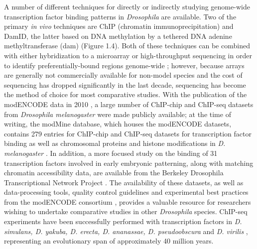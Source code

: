 A number of different techniques for directly or indirectly studying genome-wide transcription factor binding patterns in \emph{Drosophila} are available. Two of the primary \emph{in vivo} techniques are ChIP (chromatin immunoprecipitation) and DamID, the latter based on DNA methylation by a tethered DNA adenine methyltransferase (dam) \citep{greil_[16]_2006} (Figure 1.4). Both of these techniques can be combined with either hybridization to a microarray or high-throughput sequencing in order to identify preferentially-bound regions genome-wide \citep{aleksic_chiping_2009,van_steensel_chromatin_2001}; however, because arrays are generally not commercially available for non-model species and the cost of sequencing has dropped significantly in the last decade, sequencing has become the method of choice for most comparative studies. With the publication of the modENCODE data in 2010 \citep{the_modencode_consortium_identification_2010}, a large number of ChIP-chip and ChIP-seq datasets from \emph{Drosophila melanogaster} were made publicly available; at the time of writing, the modMine database, which houses the modENCODE datasets, contains 279 entries for ChIP-chip and ChIP-seq datasets for transcription factor binding as well as chromosomal proteins and histone modifications in \emph{D. melanogaster} \citep{contrino_modmine:_2011}. In addition, a more focused study on the binding of 31 transcription factors involved in early embryonic patterning, along with matching chromatin accessibility data, are available from the Berkeley Drosophila Transcriptional Network Project \citep{macarthur_developmental_2009}. The availability of these datasets, as well as data-processing tools, quality control guidelines and experimental best practices from the modENCODE consortium \citep{landt_chip-seq_2012,trinh_cloud-based_2013}, provides a valuable resource for researchers wishing to undertake comparative studies in other \emph{Drosophila} species. ChIP-seq experiments have been successfully performed with transcription factors in \emph{D. simulans, D. yakuba, D. erecta, D. ananassae, D. pseudoobscura} and \emph{D. virilis} \citep{bradley_binding_2010,he_high_2011,paris_extensive_2013,villar_evolution_2014}, representing an evolutionary span of approximately 40 million years.\\

